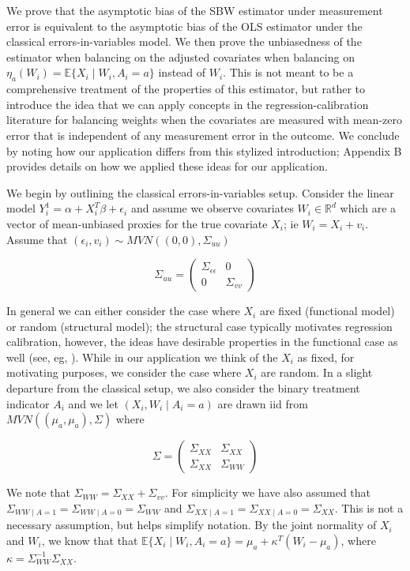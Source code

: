 \documentclass[12pt]{article}
\begin{document}
We prove that the asymptotic bias of the SBW estimator under measurement error is equivalent to the asymptotic bias of the OLS estimator under the classical errors-in-variables model. We then prove the unbiasedness of the estimator when balancing on the adjusted covariates when balancing on $\eta_a(W_i) = \mathbb{E}\{X_i \mid W_i, A_i = a\}$ instead of $W_i$. This is not meant to be a comprehensive treatment of the properties of this estimator, but rather to introduce the idea that we can apply concepts in the regression-calibration literature for balancing weights when the covariates are measured with mean-zero error that is independent of any measurement error in the outcome. We conclude by noting how our application differs from this stylized introduction; Appendix B provides details on how we applied these ideas for our application.

We begin by outlining the classical errors-in-variables setup. Consider the linear model $Y_i^1 = \alpha + X_i^T\beta + \epsilon_i$ and assume we observe covariates $W_i \in \mathbb{R}^d$ which are a vector of mean-unbiased proxies for the true covariate $X_i$; ie $W_i = X_i + v_i$. Assume that $(\epsilon_i, v_i) \sim MVN((0,0), \Sigma_{uu})$ 

$$
\Sigma_{uu} = \begin{pmatrix} 
\Sigma_{\epsilon\epsilon} & 0 \\ 
0 & \Sigma_{vv} 
\end{pmatrix}
$$ 

In general we can either consider the case where $X_i$ are fixed (functional model) or random (structural model); the structural case typically motivates regression calibration, however, the ideas have desirable properties in the functional case as well (see, eg, \cite{gleser1992importance}). While in our application we think of the $X_i$ as fixed, for motivating purposes, we consider the case where $X_i$ are random. In a slight departure from the classical setup, we also consider the binary treatment indicator $A_i$ and we let $(X_i, W_i \mid A_i = a)$ are drawn iid from $MVN((\mu_a, \mu_a), \Sigma)$ where 

$$
\Sigma = \begin{pmatrix} 
\Sigma_{XX} & \Sigma_{XX} \\ 
\Sigma_{XX} & \Sigma_{WW}  
\end{pmatrix}
$$ 

We note that $\Sigma_{WW} = \Sigma_{XX} + \Sigma_{vv}$. For simplicity we have also assumed that $\Sigma_{WW \mid A = 1} = \Sigma_{WW \mid A = 0} = \Sigma_{WW}$ and $\Sigma_{XX \mid A = 1} = \Sigma_{XX \mid A = 0} = \Sigma_{XX}$. This is not a necessary assumption, but helps simplify notation. By the joint normality of $X_i$ and $W_i$, we know that that $\mathbb{E}\{X_i \mid W_i, A_i = a\} = \mu_a + \kappa^T(W_i - \mu_a)$, where $\kappa = \Sigma_{WW}^{-1}\Sigma_{XX}$.
\end{document}
